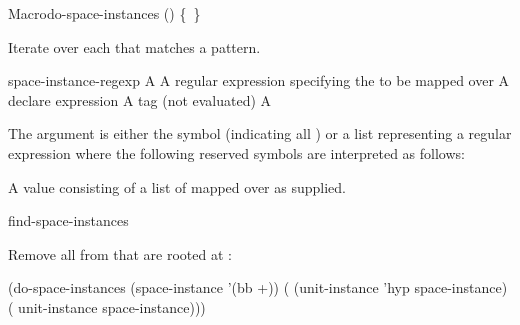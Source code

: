 \documentclass[10pt,twoside,english,pdftex]{article}
\begin{document}
\begin{functiondoc}{Macro}{do-space-instances}%
  {()
    \mbox{\{ \vbar{} \}\superstar}}

\fnsyntax

\fnpurpose Iterate over each  that matches a
 pattern.

\fnpackage {}

\fnmodule {}

\fnargs
\begin{args}{space-instance-regexp}
\arg[var] A 
 A  regular expression
specifying the  to be mapped over
\arg[declaration] A declare expression
\arg[tag] A  tag (not evaluated)
\arg[form] A 
\end{args}

\fndescription 
The  argument is either the symbol
 (indicating all ) or a list
representing a regular expression where the following reserved symbols
are interpreted as follows:
\spaceinstanceregexp

A  value consisting of a list of
 mapped over as supplied.

\begin{alsos}{find-space-instances}
\end{alsos}

\fnexample 
{}%
%
Remove all   from
 that are rooted at :
%
\W\supp
\begin{example}
  (do-space-instances (space-instance '(bb +))
    ( (unit-instance 'hyp space-instance)
      ( unit-instance space-instance)))
\end{example}

\end{functiondoc}

\end{document}
